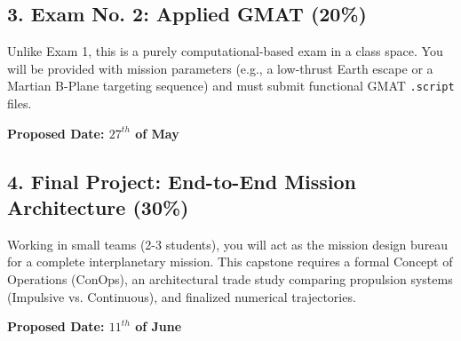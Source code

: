 \documentclass[11pt, letterpaper]{article}
\begin{document}
\subsection*{3. Exam No. 2: Applied GMAT (20\%)}
Unlike Exam 1, this is a purely computational-based exam in a class space. You will be provided with mission parameters (e.g., a low-thrust Earth escape or a Martian B-Plane targeting sequence) and must submit functional GMAT \texttt{.script} files.

\textbf{Proposed Date: $27^{th}$ of May}


\subsection*{4. Final Project: End-to-End Mission Architecture (30\%)}
Working in small teams (2-3 students), you will act as the mission design bureau for a complete interplanetary mission. This capstone requires a formal Concept of Operations (ConOps), an architectural trade study comparing propulsion systems (Impulsive vs. Continuous), and finalized numerical trajectories. 

\textbf{Proposed Date: $11^{th}$ of June}
\end{document}
